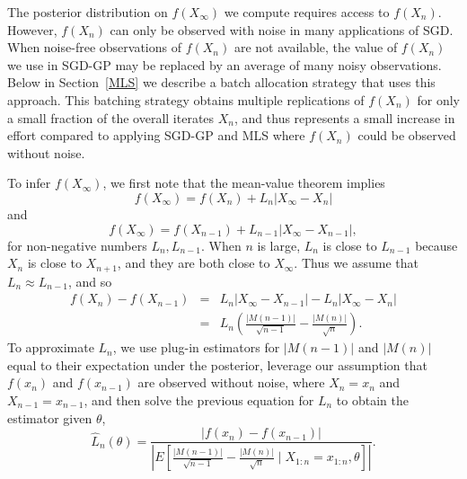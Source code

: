 \documentclass{wscpaperproc}
\theoremstyle{wsc}
\begin{document}
The posterior distribution on $f(X_\infty)$ we compute requires access to $f(X_n)$. However, $f(X_n)$ can only be observed with noise in many applications of SGD. When noise-free observations of $f(X_n)$ are not available, the value of $f(X_n)$ we use in SGD-GP may be replaced by an average of many noisy observations.  Below in Section~\ref{MLS} we describe a batch allocation strategy that uses this approach.  This batching strategy obtains multiple replications of $f(X_n)$ for only a small fraction of the overall iterates $X_n$, and thus represents a small increase in effort compared to applying SGD-GP and MLS where $f(X_n)$ could be observed without noise.

To infer $f(X_\infty)$, we first note that 
the mean-value theorem implies
\begin{equation}
\label{eq:a}
f\left(X_{\infty}\right)=f\left(X_{n}\right)+L_{n}\left|X_{\infty}-X_{n}\right|
\end{equation}
and
\[
f\left(X_{\infty}\right)=f\left(X_{n-1}\right)+L_{n-1}\left|X_{\infty}-X_{n-1}\right|,
\]
for non-negative numbers $L_{n},L_{n-1}$. When $n$ is large, $L_{n}$ is close to $L_{n-1}$ because $X_{n}$ is close to $X_{n+1}$, and they are both close to $X_{\infty}$.    Thus we assume that $L_{n}\approx L_{n-1}$, and so
\begin{eqnarray*}
f\left(X_{n}\right)-f\left(X_{n-1}\right) & = & L_{n}\left|X_{\infty}-X_{n-1}\right|-L_{n}\left|X_{\infty}-X_{n}\right|\\
 & = & L_{n}\left(\frac{|M\left(n-1\right)|}{\sqrt{n-1}}-\frac{|M\left(n\right)|}{\sqrt{n}}\right). 
\end{eqnarray*}
To approximate $L_n$, we use plug-in estimators for $|M(n-1)|$ and $|M(n)|$ equal to their expectation under the posterior, leverage our assumption that $f(x_n)$ and $f(x_{n-1})$ are observed without noise, where $X_n=x_n$ and $X_{n-1}=x_{n-1}$, and then solve the previous equation for $L_n$ to obtain the estimator given $\theta$,
\[
\hat{L}_{n}\left(\theta\right)=
\frac{\left|f\left(x_{n}\right)-f\left(x_{n-1}\right)\right|}
{\left|
E\left[
\frac{|M\left(n-1\right)|}{\sqrt{n-1}}
- \frac{|M\left(n\right)|}{\sqrt{n}}
\mid X_{1:n} = x_{1:n},\theta
\right]
\right|}.
\]
\end{document}
